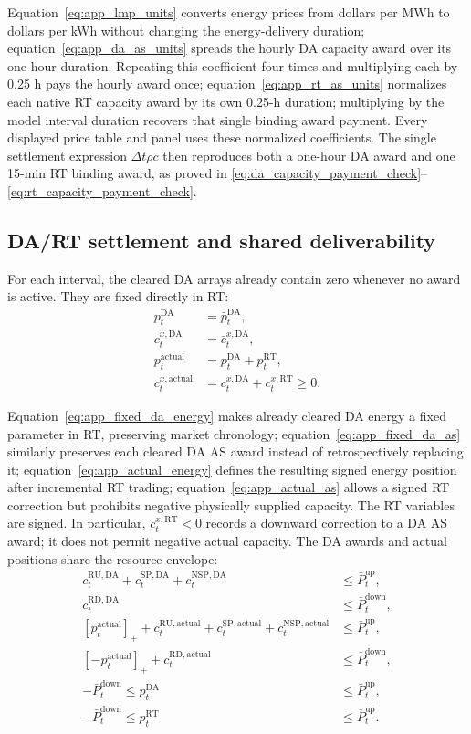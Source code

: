 \documentclass[final,5p,times]{elsarticle}
\newcommand{\dt}{\Delta t}
\newcommand{\DA}{\mathrm{DA}}
\newcommand{\RT}{\mathrm{RT}}
\newcommand{\RU}{\mathrm{RU}}
\newcommand{\RD}{\mathrm{RD}}
\newcommand{\SP}{\mathrm{SP}}
\newcommand{\NSP}{\mathrm{NSP}}
\newcommand{\actual}{\mathrm{actual}}
\newcommand{\pos}[1]{\left[#1\right]_{+}}
\begin{document}
Equation~\eqref{eq:app_lmp_units} converts energy prices from dollars per MWh to dollars per kWh without changing the energy-delivery duration; equation~\eqref{eq:app_da_as_units} spreads the hourly DA capacity award over its one-hour duration. Repeating this coefficient four times and multiplying each by 0.25 h pays the hourly award once; equation~\eqref{eq:app_rt_as_units} normalizes each native RT capacity award by its own 0.25-h duration; multiplying by the model interval duration recovers that single binding award payment.
Every displayed price table and panel uses these normalized coefficients. The
single settlement expression $\dt\rho c$ then reproduces both a one-hour DA
award and one 15-min RT binding award, as proved in
\eqref{eq:da_capacity_payment_check}--\eqref{eq:rt_capacity_payment_check}.

\subsection{DA/RT settlement and shared deliverability}
For each interval, the cleared DA arrays already contain zero whenever no award
is active. They are fixed directly in RT:
\begin{align}
p_t^{\DA}&=\bar p_t^{\DA}, \label{eq:app_fixed_da_energy}\\
c_t^{x,\DA}&=\bar c_t^{x,\DA}, \label{eq:app_fixed_da_as}\\
p_t^{\actual}&=p_t^{\DA}+p_t^{\RT}, \label{eq:app_actual_energy}\\
c_t^{x,\actual}&=c_t^{x,\DA}+c_t^{x,\RT}\ge0. \label{eq:app_actual_as}
\end{align}

Equation~\eqref{eq:app_fixed_da_energy} makes already cleared DA energy a fixed parameter in RT, preserving market chronology; equation~\eqref{eq:app_fixed_da_as} similarly preserves each cleared DA AS award instead of retrospectively replacing it; equation~\eqref{eq:app_actual_energy} defines the resulting signed energy position after incremental RT trading; equation~\eqref{eq:app_actual_as} allows a signed RT correction but prohibits negative physically supplied capacity.
The RT variables are signed. In particular, $c_t^{x,\RT}<0$ records a
downward correction to a DA AS award; it does not permit negative actual
capacity. The DA awards and actual positions share the resource envelope:
\begin{align}
c_t^{\RU,\DA}+c_t^{\SP,\DA}+c_t^{\NSP,\DA}
&\le\bar P_t^{\mathrm{up}}, \label{eq:app_da_up_capacity}\\
c_t^{\RD,\DA}&\le\bar P_t^{\mathrm{down}}, \label{eq:app_da_down_capacity}\\
\pos{p_t^{\actual}}+c_t^{\RU,\actual}+c_t^{\SP,\actual}+c_t^{\NSP,\actual}
&\le\bar P_t^{\mathrm{up}}, \label{eq:app_actual_up_capacity}\\
\pos{-p_t^{\actual}}+c_t^{\RD,\actual}
&\le\bar P_t^{\mathrm{down}}, \label{eq:app_actual_down_capacity}\\
-\bar P_t^{\mathrm{down}}\le p_t^{\DA}
&\le\bar P_t^{\mathrm{up}}, \label{eq:app_da_energy_bounds}\\
-\bar P_t^{\mathrm{down}}\le p_t^{\RT}
&\le\bar P_t^{\mathrm{up}}. \label{eq:app_rt_energy_bounds}
\end{align}
\end{document}
